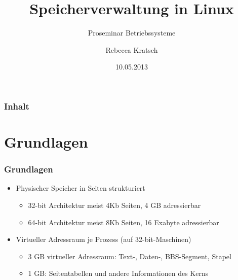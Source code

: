 \documentclass[ddcfooter,nosectionnum]{tudbeamer}
\begin{document}
\title[Speicherverwaltung in Linux]{Speicherverwaltung in Linux}
\subtitle{Proseminar Betriebssysteme}
\author{Rebecca Kratsch}

\date{10.05.2013}

\maketitle
	

\begin{frame}
    \frametitle{Inhalt}
	\tableofcontents
\end{frame}

\section{Grundlagen}
\begin{frame} 
    \frametitle{Grundlagen}
    	\begin{itemize}
			\item Physischer Speicher in Seiten strukturiert
			\begin {itemize}
				\item 32-bit Architektur meist 4Kb Seiten, 4 GB adressierbar
				\item 64-bit Architektur meist 8Kb Seiten, 16 Exabyte adressierbar
    		\end{itemize}
			\item Virtueller Adressraum je Prozess (auf 32-bit-Maschinen)
			\begin {itemize}
				\item 3 GB virtueller Adressraum: Text-, Daten-, BBS-Segment, Stapel			\item 1 GB: Seitentabellen und andere Informationen des Kerns    			\end{itemize}
    \end{itemize}
    \end{frame}
\end{document}
